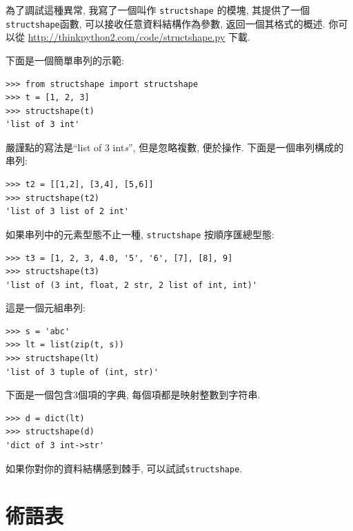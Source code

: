 \documentclass[10pt]{book}
\begin{document}
為了調試這種異常, 我寫了一個叫作 {\tt structshape} 的模塊, 
其提供了一個{\tt structshape}函數, 可以接收任意資料結構作為參數, 
返回一個其格式的概述. 
你可以從 \url{http://thinkpython2.com/code/structshape.py} 下載. 

下面是一個簡單串列的示範:

\begin{verbatim}
>>> from structshape import structshape
>>> t = [1, 2, 3]
>>> structshape(t)
'list of 3 int'
\end{verbatim}
%

嚴謹點的寫法是``list of 3 int{\em s}'', 
但是忽略複數, 便於操作. 下面是一個串列構成的串列:

\begin{verbatim}
>>> t2 = [[1,2], [3,4], [5,6]]
>>> structshape(t2)
'list of 3 list of 2 int'
\end{verbatim}
%
如果串列中的元素型態不止一種, 
{\tt structshape} 按順序匯總型態:

\begin{verbatim}
>>> t3 = [1, 2, 3, 4.0, '5', '6', [7], [8], 9]
>>> structshape(t3)
'list of (3 int, float, 2 str, 2 list of int, int)'
\end{verbatim}
%
這是一個元組串列:

\begin{verbatim}
>>> s = 'abc'
>>> lt = list(zip(t, s))
>>> structshape(lt)
'list of 3 tuple of (int, str)'
\end{verbatim}
%
下面是一個包含3個項的字典, 每個項都是映射整數到字符串.

\begin{verbatim}
>>> d = dict(lt) 
>>> structshape(d)
'dict of 3 int->str'
\end{verbatim}
%
如果你對你的資料結構感到棘手, 可以試試{\tt structshape}.


\section{術語表}
\end{document}
